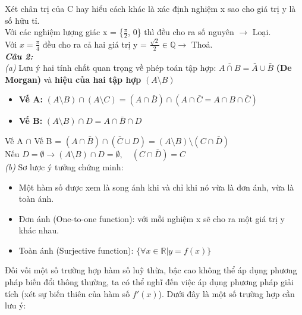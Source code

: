 \documentclass[a4paper]{exam}
\begin{document}
	Xét chân trị của C hay hiểu cách khác là xác định nghiệm x sao cho giá trị y là số hữu tỉ.\\
	
	Với các nghiệm lượng giác x = \{$\frac{\pi}{2}$, 0\} thì đều cho ra số nguyên $\longrightarrow$ Loại.\\
	
	Với $x = \frac{\pi}{4}$ đều cho ra cả hai giá trị y = $\frac{\sqrt{2}}{2} \in \mathbb{Q} \longrightarrow$ Thoả.\\
	
	\textit{\textbf{Câu 2:}}\\
	
	\textit{(a)} Lưu ý hai tính chất quan trọng về phép toán tập hợp: $\overline{A \cap B} = \bar{A} \cup \bar{B}$ \textbf{(De Morgan)} và \textbf{hiệu của hai tập hợp} $(A \setminus B)$
	
	\begin{itemize}
		\item \textbf{Vế A: } $(A \setminus B) \cap (A \setminus C) = (A \cap \bar{B}) \cap (A \cap \bar{C} = A \cap B \cap \bar{C})$
		\item \textbf{Vế B: } $(A \setminus B) \cap D = A \cap \bar{B} \cap D$
	\end{itemize}
	
	Vế A $\cap$ Vế B = $(A \cap \bar{B}) \cap (\bar{C} \cup D) = (A \setminus B) \setminus (C \cap \bar{D})$\\
	
	Nếu $D = \emptyset \longrightarrow (A \setminus B) \cap D = \emptyset, \quad (C \cap \bar{D}) = C$\\
	
	\textit{(b)} Sơ lược ý tưởng chứng minh:
	
	\begin{itemize}
		\item Một hàm số được xem là song ánh khi và chỉ khi nó vừa là đơn ánh, vừa là toàn ánh.
		\item Đơn ánh (One-to-one function): với mỗi nghiệm x sẽ cho ra một giá trị y khác nhau.
		\item Toàn ánh (Surjective function): $\{\forall x \in \mathbb{R} | y = f(x) \}$ 
	\end{itemize}
	
	Đối vối một số trường hợp hàm số luỹ thừa, bậc cao không thể áp dụng phương pháp biến đổi thông thường, ta có thể nghĩ đến việc áp dụng phương pháp giải tích (xét sự biến thiên của hàm số $f'(x)$). Dưới đây là một số trường hợp cần lưu ý:
	
\end{document}
